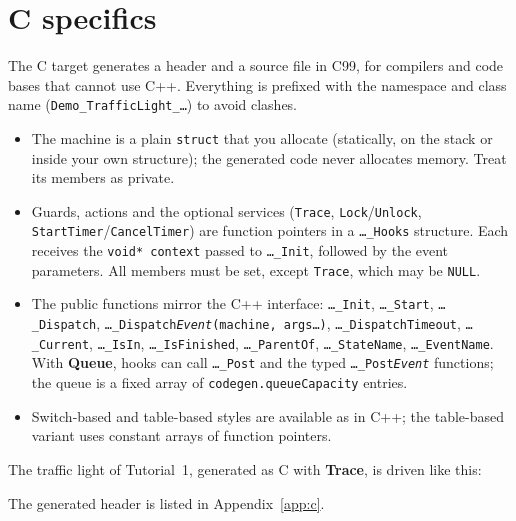 \documentclass[11pt,a4paper,openany]{report}
\newcommand{\ui}[1]{\textsf{\textbf{#1}}}
\newcommand{\code}[1]{\texttt{#1}}
\begin{document}
\section{C specifics}
\label{sec:c}
The C target generates a header and a source file in C99, for compilers and code bases that cannot
use C++. Everything is prefixed with the namespace and class name (\code{Demo\_TrafficLight\_\dots})
to avoid clashes.
\begin{itemize}[itemsep=1pt]
  \item The machine is a plain \code{struct} that you allocate (statically, on the stack or inside your
        own structure); the generated code never allocates memory. Treat its members as private.
  \item Guards, actions and the optional services (\code{Trace}, \code{Lock}/\code{Unlock},
        \code{StartTimer}/\code{CancelTimer}) are function pointers in a \code{\dots\_Hooks} structure.
        Each receives the \code{void* context} passed to \code{\dots\_Init}, followed by the event
        parameters. All members must be set, except \code{Trace}, which may be \code{NULL}.
  \item The public functions mirror the C++ interface: \code{\dots\_Init}, \code{\dots\_Start},
        \code{\dots\_Dispatch}, \code{\dots\_Dispatch\textit{Event}(machine, args\dots)},
        \code{\dots\_DispatchTimeout}, \code{\dots\_Current}, \code{\dots\_IsIn},
        \code{\dots\_IsFinished}, \code{\dots\_ParentOf}, \code{\dots\_StateName},
        \code{\dots\_EventName}. With \ui{Queue}, hooks can call \code{\dots\_Post} and the typed
        \code{\dots\_Post\textit{Event}} functions; the queue is a fixed array of
        \code{codegen.queueCapacity} entries.
  \item Switch-based and table-based styles are available as in C++; the table-based variant uses
        constant arrays of function pointers.
\end{itemize}
The traffic light of Tutorial~1, generated as C with \ui{Trace}, is driven like this:





The generated header is listed in Appendix~\ref{app:c}.
\end{document}
